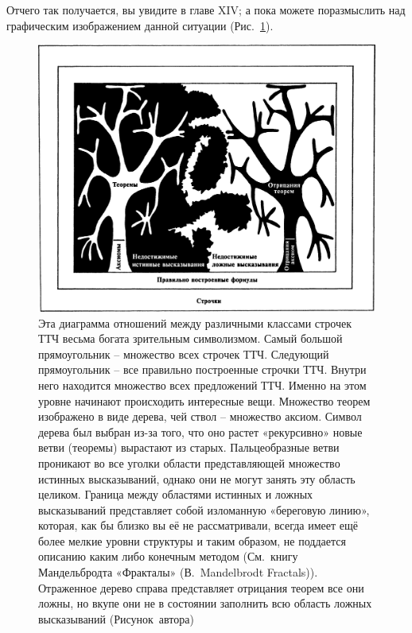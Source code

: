 \documentclass[../main.tex]{subfiles}
\begin{document}
Отчего так получается, вы увидите в главе XIV; а пока можете поразмыслить над графическим изображением данной ситуации (Рис.~\ref{fig:formulae}).

\begin{figure}
    \centering
    \includegraphics[width=\textwidth, max totalheight=\textheight-2\baselineskip]{img/formulae.png}
    \caption{Эта диаграмма отношений между различными классами строчек ТТЧ весьма богата зрительным символизмом. Самый большой прямоугольник \--- множество всех строчек ТТЧ\@. Следующий прямоугольник \--- все правильно построенные строчки ТТЧ\@. Внутри него находится множество всех предложений ТТЧ\@. Именно на этом уровне начинают происходить интересные вещи. Множество теорем изображено в виде дерева, чей ствол \--- множество аксиом. Символ дерева был выбран из-за того, что оно растет «рекурсивно» новые ветви (теоремы) вырастают из старых. Пальцеобразные ветви проникают во все уголки области представляющей множество истинных высказываний, однако они не могут занять эту область целиком. Граница между областями истинных и ложных высказываний представляет собой изломанную «береговую линию», которая, как бы близко вы её не рассматривали, всегда имеет ещё более мелкие уровни структуры и таким образом, не поддается описанию каким либо конечным методом (См.~книгу Мандельбродта «Фракталы» (В.~Mandelbrodt Fractals)). Отраженное дерево справа представляет отрицания теорем все они ложны, но вкупе они не в состоянии заполнить всю область ложных высказываний (Рисунок~автора)}
    \label{fig:formulae}
\end{figure}
\end{document}
